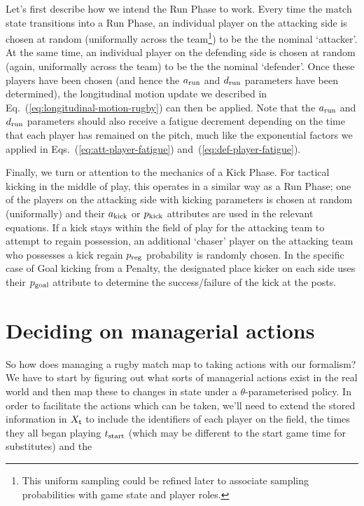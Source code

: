 Let's first describe how we intend the {\sf Run Phase} to work. Every time the match state transitions into a {\sf Run Phase}, an individual player on the attacking side is chosen at random (uniformally across the team\footnote{This uniform sampling could be refined later to associate sampling probabilities with game state and player roles.}) to be the the nominal `attacker'. At the same time, an individual player on the defending side is chosen at random (again, uniformally across the team) to be the the nominal `defender'. Once these players have been chosen (and hence the $a_{\rm run}$ and $d_{\rm run}$ parameters have been determined), the longitudinal motion update we described in Eq.~(\ref{eq:longitudinal-motion-rugby}) can then be applied. Note that the $a_{\rm run}$ and $d_{\rm run}$ parameters should also receive a fatigue decrement depending on the time that each player has remained on the pitch, much like the exponential factors we applied in Eqs.~(\ref{eq:att-player-fatigue}) and~(\ref{eq:def-player-fatigue}).

Finally, we turn or attention to the mechanics of a {\sf Kick Phase}. For tactical kicking in the middle of play, this operates in a similar way as a {\sf Run Phase}; one of the players on the attacking side with kicking parameters is chosen at random (uniformally) and their $a_{\rm kick}$ or $p_{\rm kick}$ attributes are used in the relevant equations. If a kick stays within the field of play for the attacking team to attempt to regain possession, an additional `chaser' player on the attacking team who possesses a kick regain $p_{\rm reg}$ probability is randomly chosen. In the specific case of {\sf Goal} kicking from a {\sf Penalty}, the designated place kicker on each side uses their $p_{\rm goal}$ attribute to determine the success/failure of the kick at the posts.

\section{\sffamily Deciding on managerial actions}

So how does managing a rugby match map to taking actions with our formalism? We have to start by figuring out what sorts of managerial actions exist in the real world and then map these to changes in state under a $\theta$-parameterised policy. In order to facilitate the actions which can be taken, we'll need to extend the stored information in $X_{{\sf t}}$ to include the identifiers of each player on the field, the times they all began playing $t_{\rm start}$ (which may be different to the start game time for substitutes) and the  


